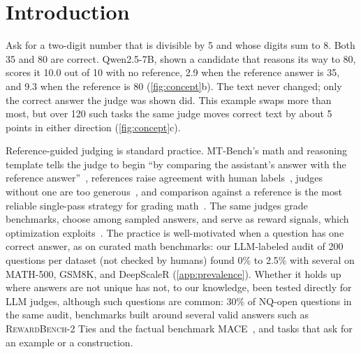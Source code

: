 \documentclass{article}
\begin{document}
\section{Introduction}
\label{sec:intro}

Ask for a two-digit number that is divisible by 5 and whose digits sum to 8.
Both 35 and 80 are correct.
Qwen2.5-7B, shown a candidate that reasons its way to 80, scores it 10.0 out of 10 with no reference, 2.9 when the reference answer is 35, and 9.3 when the reference is 80 (\cref{fig:concept}b).
The text never changed; only the correct answer the judge was shown did.
This example swaps more than most, but over 120 such tasks the same judge moves correct text by about 5 points in either direction (\cref{fig:concept}c).

Reference-guided judging is standard practice.
MT-Bench's math and reasoning template tells the judge to begin ``by comparing the assistant's answer with the reference answer''~\citep{zheng2023judging}, references raise agreement with human labels~\citep{refguided2024}, judges without one are too generous~\citep{generous2026}, and comparison against a reference is the most reliable single-pass strategy for grading math~\citep{chen2026rethinking}.
The same judges grade benchmarks, choose among sampled answers, and serve as reward signals, which optimization exploits~\citep{gao2022scaling}.
The practice is well-motivated when a question has one correct answer, as on curated math benchmarks: our LLM-labeled audit of 200 questions per dataset (not checked by humans) found 0\% to 2.5\% with several on MATH-500, GSM8K, and DeepScaleR (\cref{app:prevalence}).
Whether it holds up where answers are not unique has not, to our knowledge, been tested directly for LLM judges, although such questions are common: 30\% of NQ-open questions in the same audit, benchmarks built around several valid answers such as \textsc{RewardBench-2} Ties and the factual benchmark \textsc{MACE}~\citep{malik2025rewardbench2,mace2026}, and tasks that ask for an example or a construction.
\end{document}
